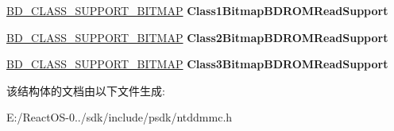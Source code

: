 \begin{DoxyCompactItemize}
\hyperlink{struct___b_d___c_l_a_s_s___s_u_p_p_o_r_t___b_i_t_m_a_p}{B\+D\+\_\+\+C\+L\+A\+S\+S\+\_\+\+S\+U\+P\+P\+O\+R\+T\+\_\+\+B\+I\+T\+M\+AP} {\bfseries Class1\+Bitmap\+B\+D\+R\+O\+M\+Read\+Support}
\item 
\mbox{\label{struct___f_e_a_t_u_r_e___b_d___r_e_a_d_a8de031136b2334eaef5f72d2561a3416}} 
\hyperlink{struct___b_d___c_l_a_s_s___s_u_p_p_o_r_t___b_i_t_m_a_p}{B\+D\+\_\+\+C\+L\+A\+S\+S\+\_\+\+S\+U\+P\+P\+O\+R\+T\+\_\+\+B\+I\+T\+M\+AP} {\bfseries Class2\+Bitmap\+B\+D\+R\+O\+M\+Read\+Support}
\item 
\mbox{\label{struct___f_e_a_t_u_r_e___b_d___r_e_a_d_a56649d28c40b5748faba7d9336057171}} 
\hyperlink{struct___b_d___c_l_a_s_s___s_u_p_p_o_r_t___b_i_t_m_a_p}{B\+D\+\_\+\+C\+L\+A\+S\+S\+\_\+\+S\+U\+P\+P\+O\+R\+T\+\_\+\+B\+I\+T\+M\+AP} {\bfseries Class3\+Bitmap\+B\+D\+R\+O\+M\+Read\+Support}
\end{DoxyCompactItemize}


该结构体的文档由以下文件生成\+:\begin{DoxyCompactItemize}
\item 
E\+:/\+React\+O\+S-\/0../sdk/include/psdk/ntddmmc.\+h\end{DoxyCompactItemize}

